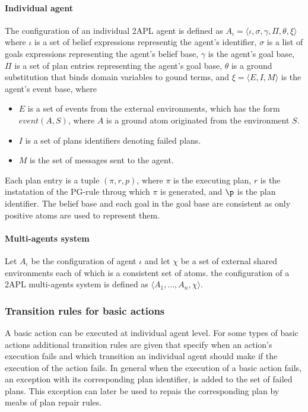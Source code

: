 \documentclass[a4paper]{article}
\begin{document}
\paragraph{Individual agent}

The configuration of an individual 2APL agent is defined as $ A_{\iota} = \langle \iota, \sigma, \gamma, \Pi, \theta, \xi \rangle $ where $\iota$ is a set of belief expressions representig the agent's identifier, $\sigma$ is a list of goals expressions representing the agent's belief base, $\gamma$ is the agent's goal base,  $\Pi$ is a set of plan entries representing the agent's goal base, $\theta$ is a ground substitution that binds domain variables to gound terms, and $\xi = \langle E, I, M \rangle$ is the agent's event base, where

\begin{itemize}
 \item $E$ is a set of events from the external environments, which has the form $event(A,S)$, where $A$ is a ground atom originated from the environment $S$.
 \item $I$ is a set of plans identifiers denoting failed plans.
 \item $M$ is the set of messages sent to the agent.
\end{itemize}

Each plan entry is a tuple $(\pi, r, p)$, where $\pi$ is the executing plan, $r$ is the instatation of the PG-rule throug  which $\pi$ is generated, and $\p$ is the plan identifier. The belief base and each goal in the goal base are consistent as only positive atoms are used to represent them.

\paragraph{Multi-agents system}

Let $A_{\iota}$ be the configuration of agent $\iota$ and let $\chi$ be a set of external shared environments each of which is a consistent set of atoms. the configuration of a 2APL multi-agents system is defined as $ \langle A_{1}, \ldots, A_{n}, \chi \rangle $.

\subsubsection{Transition rules for basic actions}

A basic action can be executed at individual agent level. For some types of basic actions additional transition rules are given that specify when an action's execution fails and which transition an individual agent should make if the execution of the action fails. In general when the execution of a basic action fails, an exception with its corresponding plan identifier, is added to the set of failed plans. This exception can later be used to repais the corresponding plan by meabs of plan repair rules.
\end{document}

